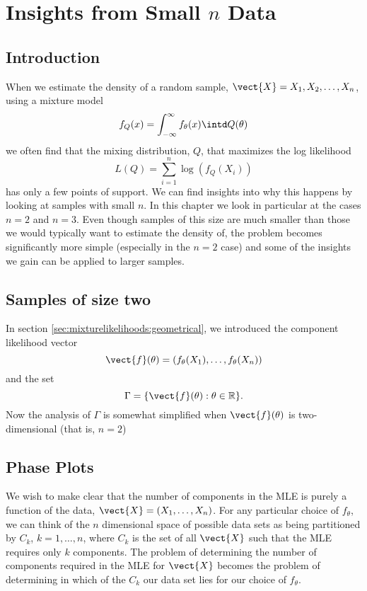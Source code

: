\chapter{Insights from Small \texorpdfstring{$n$}{n} Data}
\label{Ch:SmallNData}



\section{Introduction}
	When we estimate the density of a random sample, $\vect{X} = X_1,X_2,\dots,X_n$, using a mixture model
	\begin{equation}
	f_Q(x) = \int_{-\infty}^{\infty} f_\theta(x) \intd Q(\theta)
	\end{equation}
	we often find that the mixing distribution, $Q$, that maximizes the log likelihood 
	\begin{equation}
	L(Q) = \sum_{i = 1}^n \log(f_Q(X_i))
	\label{smallndata:eq:likelihood}
	\end{equation}
	has only a few points of support. We can find insights into why this happens by looking at samples with small $n$. In this chapter we look in particular at the cases $n=2$ and $n=3$. Even though samples of this size are much smaller than those we would typically want to estimate the density of, the problem becomes significantly more simple (especially in the $n=2$ case) and some of the insights we gain can be applied to larger samples.

\section{Samples of size two}
	In section \ref{sec:mixturelikelihoods:geometrical}, we introduced the component likelihood vector 
	$$\vect{f}(\theta) = (f_\theta(X_1), \dots, f_\theta(X_n))$$
	and the set
	$$\Gamma = \{\vect{f}(\theta) : \theta \in \mathbb{R} \}.$$
	Now the analysis of $\Gamma$ is somewhat simplified when $\vect{f}(\theta)$ is two-dimensional (that is, $n = 2$)

\section{Phase Plots}
	We wish to make clear that the number of components in the MLE is purely a function of the data, $\vect{X} = (X_1, \dots, X_n)$. For any particular choice of $f_\theta$, we can think of the $n$ dimensional space of possible data sets as being partitioned by $C_k$, $k = 1,\dots,n$, where $C_k$ is the set of all $\vect{X}$ such that the MLE requires only $k$ components. The problem of determining the number of components required in the MLE for $\vect{X}$ becomes the problem of determining in which of the $C_k$ our data set lies for our choice of $f_\theta$.

